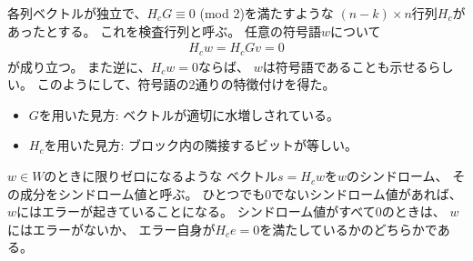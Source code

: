 \documentclass[]{ltjsarticle}
\begin{document}
各列ベクトルが独立で、$H_cG\equiv 0$ (mod 2)を満たすような
$(n-k) \times n$行列$H_c$があったとする。
これを検査行列と呼ぶ。
任意の符号語$w$について
\begin{align}
    H_c w = H_c Gv = 0
\end{align}
が成り立つ。
また逆に、$H_c w = 0$ならば、
$w$は符号語であることも示せるらしい。
このようにして、符号語の2通りの特徴付けを得た。
\begin{itemize}
    \item $G$を用いた見方: ベクトルが適切に水増しされている。
    \item $H_c$を用いた見方: ブロック内の隣接するビットが等しい。
\end{itemize}

$w \in W$のときに限りゼロになるような
ベクトル$s = H_c w$を$w$のシンドローム、
その成分をシンドローム値と呼ぶ。
ひとつでも0でないシンドローム値があれば、
$w$にはエラーが起きていることになる。
シンドローム値がすべて0のときは、
$w$にはエラーがないか、
エラー自身が$H_c e = 0$を満たしているかのどちらかである。
\end{document}
